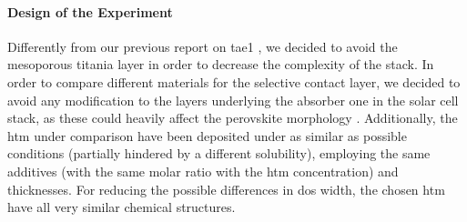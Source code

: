 \begin{figure}
\end{figure}

\paragraph{Design of the Experiment}
Differently from our previous report on \gls{tae1} \cite{Cabau2015a}, we decided to avoid the mesoporous titania layer in order to decrease the complexity of the stack.
In order to compare different materials for the selective contact layer, we decided to avoid any modification to the layers underlying the absorber one in the solar cell stack, as these could heavily affect the perovskite morphology \cite{Tao2017,Bi2015}.
Additionally, the \gls{htm} under comparison have been deposited under as similar as possible conditions (partially hindered by a different solubility), employing the same additives (with the same molar ratio with the \gls{htm} concentration) and thicknesses.
For reducing the possible differences in \gls{dos} width, the chosen \gls{htm} have all very similar chemical structures.


